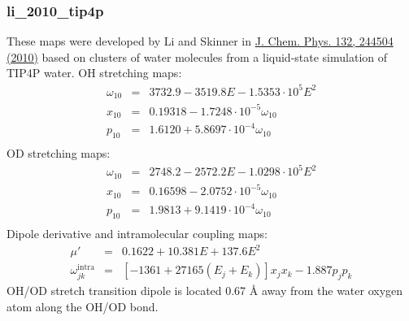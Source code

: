 \documentclass{article}
\begin{document}
\subsubsection{li\_2010\_tip4p}
These maps were developed by Li and Skinner in \href{https://pubs.acs.org/doi/10.1021/ct400292q}{J. Chem. Phys. 132, 244504 (2010)} based on clusters
of water molecules from a liquid-state simulation of TIP4P water. OH stretching maps:
\begin{eqnarray}
\omega_{10} &=& 3732.9 - 3519.8E-1.5353\cdot 10^5E^2 \nonumber\\
x_{10} &=& 0.19318 - 1.7248\cdot 10^{-5} \omega_{10} \nonumber \\
p_{10} &=& 1.6120 + 5.8697\cdot 10^{-4} \omega_{10} \nonumber \\
\end{eqnarray}
OD stretching maps:
\begin{eqnarray}
\omega_{10} &=& 2748.2 - 2572.2E-1.0298\cdot 10^5 E^2 \nonumber\\
x_{10} &=& 0.16598 - 2.0752\cdot 10^{-5} \omega_{10} \nonumber \\
p_{10} &=& 1.9813 + 9.1419\cdot 10^{-4} \omega_{10} \nonumber \\
\end{eqnarray}
Dipole derivative and intramolecular coupling maps:
\begin{eqnarray}
\mu' &=& 0.1622 + 10.381E + 137.6E^2 \nonumber \\
\omega_{jk}^\text{intra}&=& [-1361 + 27165(E_j + E_k)]x_jx_k - 1.887 p_j p_k \nonumber
\end{eqnarray}
OH/OD stretch transition dipole is located 0.67 \AA{} away from the water oxygen atom along the OH/OD bond.
\end{document}
